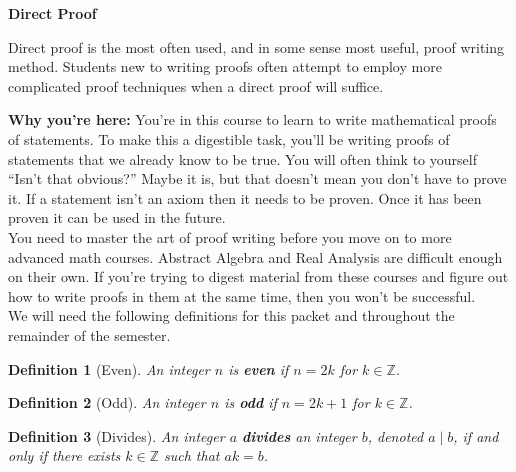 \documentclass[12 pt]{article}
\newcommand{\Z}{\mathbb{Z}}
\newcommand{\divides}{\! \mid \!}
\theoremstyle{definition}
\theoremstyle{plain}
\theoremstyle{mytheorem}
\theoremstyle{myexample}
\theoremstyle{mydefinition}
\newtheorem{definition}{Definition}
\begin{document}
\begin{center}
\textbf{Direct Proof}
\end{center}

Direct proof is the most often used, and in some sense most useful, proof writing method.  Students new to writing proofs often attempt to employ more complicated proof techniques when a direct proof will suffice.

\begin{center}
\end{center}

\noindent \textbf{Why you're here:}  You're in this course to learn to write mathematical proofs of statements.  To make this a digestible task, you'll be writing proofs of statements that we already know to be true.  You will often think to yourself ``Isn't that obvious?''  Maybe it is, but that doesn't mean you don't have to prove it.  If a statement isn't an axiom then it needs to be proven.  Once it has been proven it can be used in the future.\\

You need to master the art of proof writing before you move on to more advanced math courses.  Abstract Algebra and Real Analysis are difficult enough on their own.  If you're trying to digest material from these courses and figure out how to write proofs in them at the same time, then you won't be successful.  \\

We will need the following definitions for this packet and throughout the remainder of the semester.

\begin{definition}[Even] An integer $n$ is \textbf{even} if $n= 2k$ for $k \in \Z$.
\end{definition}

\begin{definition}[Odd] An integer $n$ is \textbf{odd} if $n=2k+1$ for $k \in \Z$.
\end{definition}

\begin{definition}[Divides] An integer $a$ \textbf{divides} an integer $b$, denoted $a \divides b$, if and only if there exists $k \in \Z$ such that $ak=b$.
\end{definition}
\end{document}
